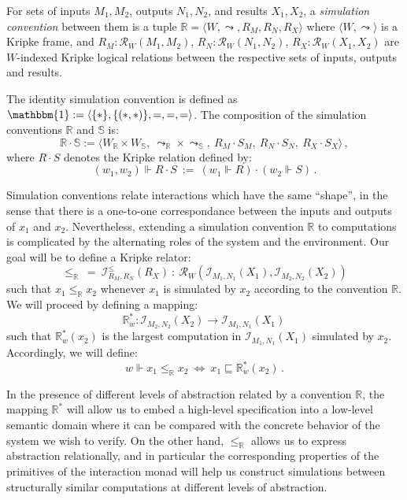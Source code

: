 \begin{definition}
For sets of inputs $M_1, M_2$, outputs $N_1, N_2$, and results $X_1, X_2$,
a \emph{simulation convention} between them
is a tuple $\mathbb{R} = \langle W, \leadsto, R_M, R_N, R_X \rangle$
where $\langle W, \leadsto \rangle$ is a Kripke frame, and
$R_M : \mathcal{R}_W(M_1, M_2)$,
$R_N : \mathcal{R}_W(N_1, N_2)$,
$R_X : \mathcal{R}_W(X_1, X_2)$
are $W$-indexed Kripke logical relations
between the respective sets of inputs, outputs and results.

The identity simulation convention is defined as
$\mathbbm{1} := \langle \{*\}, \{(*,*)\}, {=}, {=}, {=} \rangle$.
The composition of
the simulation conventions $\mathbb{R}$ and $\mathbb{S}$ is:
\[
    \mathbb{R} \cdot \mathbb{S} :=
      \langle
        W_\mathbb{R} \times W_\mathbb{S}, \:
        {\leadsto}_\mathbb{R} \times {\leadsto}_\mathbb{S}, \:
        R_M \cdot S_M, \:
        R_N \cdot S_N, \:
        R_X \cdot S_X
      \rangle \,,
\]
where $R \cdot S$ denotes the Kripke relation defined by:
\[
    (w_1, w_2) \Vdash R \cdot S \: := \:
      (w_1 \Vdash R) \cdot (w_2 \Vdash S) \,.
\]

\end{definition}

Simulation conventions relate interactions which have the same ``shape'',
in the sense that there is a one-to-one correspondance between
the inputs and outputs of $x_1$ and $x_2$.
Nevertheless,
extending a simulation convention $\mathbb{R}$ to computations
is complicated by the alternating roles of the system and the environment.
Our goal will be to define a Kripke relator:
\[ {\le}_\mathbb{R} \: = \:
   \mathcal{I}^\le_{R_M,R_N}(R_X) \: : \:
   \mathcal{R}_W(\mathcal{I}_{M_1,N_1}(X_1), \mathcal{I}_{M_2,N_2}(X_2)) \]
such that $x_1 \le_\mathbb{R} x_2$
whenever $x_1$ is simulated by $x_2$ according to the convention $\mathbb{R}$.
We will proceed by defining a mapping:
\[ \mathbb{R}^*_w : \mathcal{I}_{M_2,N_2}(X_2) \rightarrow
                    \mathcal{I}_{M_1,N_1}(X_1) \, \]
such that $\mathbb{R}^*_w(x_2)$ is
the largest computation in $\mathcal{I}_{M_1,N_1}(X_1)$
simulated by $x_2$.
Accordingly,
we will define:
\[ w \Vdash x_1 \le_\mathbb{R} x_2 \: \Leftrightarrow \:
   x_1 \sqsubseteq \mathbb{R}^*_w(x_2) \,. \]

In the presence of different levels of abstraction
related by a convention $\mathbb{R}$,
the mapping $\mathbb{R}^*$ will allow us to embed a high-level specification
into a low-level semantic domain
where it can be compared with
the concrete behavior of the system we wish to verify.
On the other hand, $\le_\mathbb{R}$
allows us to express abstraction relationally,
and in particular the corresponding properties of
the primitives of the interaction monad
will help us construct
simulations between
structurally similar computations
at different levels of abstraction.


